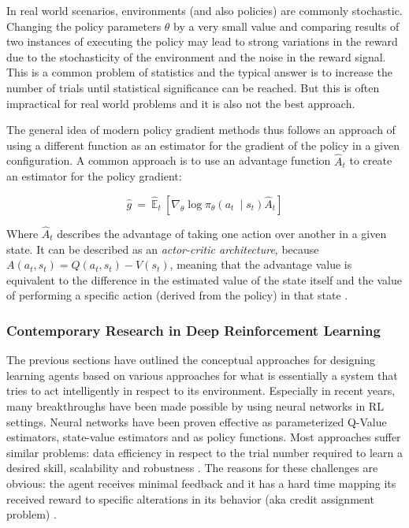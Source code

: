 In real world scenarios, environments (and also policies) are commonly stochastic. Changing the policy
parameters $\theta$ by a very small value and comparing results of two instances of executing the policy may lead to
strong variations in the reward due to the stochasticity of the environment and the noise in the reward
signal. This is a common problem of statistics and the typical answer is to increase the number of trials until
statistical significance can be reached. But this is often impractical for real world problems and it is also not the
best approach.

The general idea of modern policy gradient methods thus follows an approach of using a different function as an
estimator for the gradient of the policy in a given configuration. A common approach is to use an advantage function
$\hat{A}_t$ to create an estimator for the policy gradient:


\begin{equation}
    \hat{g} \ =\ \hat{\mathbb{E}}_{t} \ \left[ \nabla _{\theta }\log \pi _{\theta }( a_{t} \ \mid s_{t})\hat{A}_{t}  \right]
\end{equation}

\noindent Where $\hat{A}_t$ describes the advantage of taking one action over another in a given state. It can be
described as an \emph{actor-critic architecture}, because $A(a_t, s_t) = Q(a_t,s_t) - V(s_t)$, meaning that the
advantage value is equivalent to the difference in the estimated value of the state itself and the value of performing
a specific action (derived from the policy) in that state \citep{mnih2016asynchronous}.

\subsubsection{Contemporary Research in Deep Reinforcement Learning}%
\label{sub:deep_learning_in_reinforcement_settings}

The previous sections have outlined the conceptual approaches for designing learning agents based on various approaches
for what is essentially a system that tries to act intelligently in respect to its environment. Especially in recent
years, many breakthroughs have been made possible by using neural networks in \ac{RL} settings. Neural networks have
been proven effective as
parameterized Q-Value estimators, state-value estimators and as policy functions. Most approaches suffer similar
problems: data efficiency in respect to the trial number required to learn a desired skill, scalability and robustness
\citep{proximalpolicyopt}. The reasons for these challenges are obvious: the agent receives minimal feedback and it has
a hard time mapping its received reward to specific alterations in its behavior (aka credit assignment problem)
\citep{arulkumaran2017brief}.

